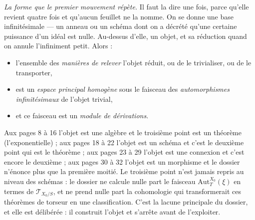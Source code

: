 \documentclass[11pt,a4paper]{article}
\begin{document}
\emph{La forme que le premier mouvement répète.} Il faut la dire une fois,
parce qu'elle revient quatre fois et qu'aucun feuillet ne la nomme. On se donne
une base infinitésimale — un anneau ou un schéma dont on a décrété qu'une
certaine puissance d'un idéal est nulle. Au-dessus d'elle, un objet, et sa
réduction quand on annule l'infiniment petit. Alors :

\begin{itemize}
  \item l'ensemble des \emph{manières de relever} l'objet réduit, ou de le
  trivialiser, ou de le transporter,
  \item est un \emph{espace principal homogène} sous le faisceau des
  \emph{automorphismes infinitésimaux} de l'objet trivial,
  \item et ce faisceau est un \emph{module de dérivations}.
\end{itemize}

Aux pages 8 à 16 l'objet est une algèbre et le troisième point est un théorème
(l'exponentielle) ; aux pages 18 à 22 l'objet est un schéma et c'est le
deuxième point qui est le théorème ; aux pages 23 à 29 l'objet est une connexion
et c'est encore le deuxième ; aux pages 30 à 32 l'objet est un morphisme et le
dossier n'énonce plus que la première moitié. Le troisième point n'est jamais
repris au niveau des schémas : le dossier ne calcule nulle part le faisceau
$\mathrm{Aut}^{X_0}_T(\xi)$ en termes de $\mathcal{T}_{X_0/S}$, et ne prend
nulle part la cohomologie qui transformerait ces théorèmes de torseur en une
classification. C'est la lacune principale du dossier, et elle est
délibérée : il construit l'objet et s'arrête avant de l'exploiter.
\end{document}
